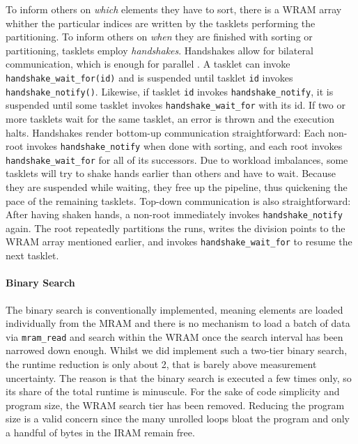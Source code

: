 To inform others on \emph{which} elements they have to sort, there is a WRAM array whither the particular indices are written by the tasklets performing the partitioning.
To inform others on \emph{when} they are finished with sorting or partitioning, tasklets employ \emph{handshakes}.
Handshakes allow for bilateral communication, which is enough for parallel \MS{}.
A tasklet can invoke \lstinline|handshake_wait_for(id)| and is suspended until tasklet \lstinline|id| invokes \lstinline|handshake_notify()|.
Likewise, if tasklet \lstinline|id| invokes \lstinline|handshake_notify|, it is suspended until some tasklet invokes \lstinline|handshake_wait_for| with its id.
If two or more tasklets wait for the same tasklet, an error is thrown and the execution halts.
Handshakes render bottom-up communication straightforward:
Each non-root invokes \lstinline|handshake_notify| when done with sorting, and each root invokes \lstinline|handshake_wait_for| for all of its successors.
Due to workload imbalances, some tasklets will try to shake hands earlier than others and have to wait.
Because they are suspended while waiting, they free up the pipeline, thus quickening the pace of the remaining tasklets.
Top-down communication is also straightforward:
After having shaken hands, a non-root immediately invokes \lstinline|handshake_notify| again.
The root repeatedly partitions the runs, writes the division points to the WRAM array mentioned earlier, and invokes \lstinline|handshake_wait_for| to resume the next tasklet.


\paragraph{Binary Search}
The binary search is conventionally implemented, meaning elements are loaded individually from the MRAM and there is no mechanism to load a batch of data via \lstinline|mram_read| and search within the WRAM once the search interval has been narrowed down enough.
Whilst we did implement such a two-tier binary search, the runtime reduction is only about \qty{2}{\permyriad}, that is barely above measurement uncertainty.
The reason is that the binary search is executed a few times only, so its share of the total runtime is minuscule.
For the sake of code simplicity and program size, the WRAM search tier has been removed.
Reducing the program size is a valid concern since the many unrolled loops bloat the program and only a handful of bytes in the IRAM remain free.

